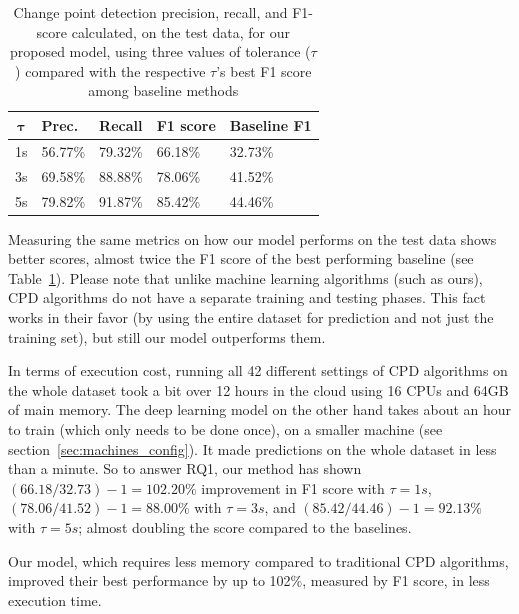 \begin{table}
\caption{Change point detection precision, recall, and F1-score calculated, on the test data, for our proposed model, using three values of tolerance ($\tau$) compared with the respective $\tau$'s best F1 score among baseline methods}
\label{tab:rq1-2-results}
\begin{tabularx}{\columnwidth}{cXXXX}
\toprule
  $\mathbf{\tau}$ &
  \textbf{Prec.} &
  \textbf{Recall} &
  \textbf{F1 score} & 
  \textbf{Baseline F1}  \\ \midrule
1s & 56.77\% &	79.32\% &	66.18\% & 32.73\% \\
3s & 69.58\% &	88.88\% &	78.06\% & 41.52\% \\
5s & 79.82\% &	91.87\%	&   85.42\% & 44.46\% \\\bottomrule
\end{tabularx}
\end{table}

Measuring the same metrics on how our model performs on the test data shows better scores, almost twice the F1 score of the best performing baseline (see Table~\ref{tab:rq1-2-results}). Please note that unlike machine learning algorithms (such as ours), CPD algorithms do not have a separate training and testing phases. This fact works in their favor (by using the entire dataset for prediction and not just the training set), but still our model outperforms them.

In terms of execution cost, running all 42 different settings of CPD algorithms on the whole dataset took a bit over 12 hours in the cloud using 16 CPUs and 64GB of main memory. The deep learning model on the other hand takes about an hour to train (which only needs to be done once), on a smaller machine (see section~\ref{sec:machines_config}). It made predictions on the whole dataset in less than a minute.
So to answer RQ1, our method has shown $(66.18/32.73)-1=102.20\%$ improvement in F1 score with $\tau=1s$, $(78.06/41.52)-1=88.00\%$ with $\tau=3s$, and $(85.42/44.46)-1=92.13\%$ with $\tau=5s$; almost doubling the score compared to the baselines. 

\begin{rqanswer}
Our model, which requires less memory compared to traditional CPD algorithms, improved their best performance by up to 102\%, measured by F1 score, in less execution time.
\end{rqanswer}


